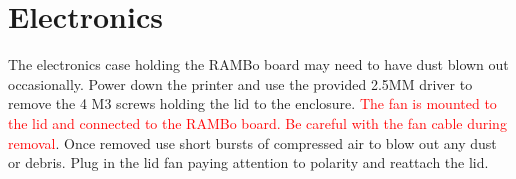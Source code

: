 \section{Electronics}
The electronics case holding the RAMBo board may need to have dust blown out occasionally. Power down the printer and use the provided 2.5MM driver to remove the 4 M3 screws holding the lid to the enclosure. \textcolor{red}{The fan is mounted to the lid and connected to the RAMBo board. Be careful with the fan cable during removal}. Once removed use short bursts of compressed air to blow out any dust or debris. Plug in the lid fan paying attention to polarity and reattach the lid.
